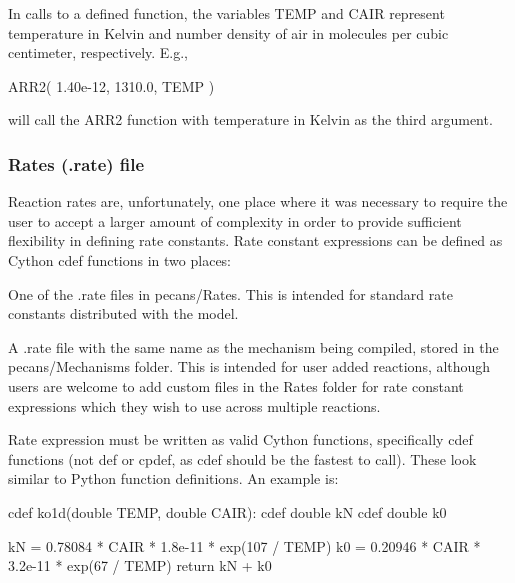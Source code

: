 In calls to a defined function, the variables {\ttfamily T\+E\+MP} and {\ttfamily C\+A\+IR} represent temperature in Kelvin and number density of air in molecules per cubic centimeter, respectively. E.\+g., \begin{DoxyVerb}ARR2( 1.40e-12, 1310.0, TEMP )
\end{DoxyVerb}


will call the {\ttfamily A\+R\+R2} function with temperature in Kelvin as the third argument.

\subsubsection*{Rates (.rate) file}

Reaction rates are, unfortunately, one place where it was necessary to require the user to accept a larger amount of complexity in order to provide sufficient flexibility in defining rate constants. Rate constant expressions can be defined as Cython {\ttfamily cdef} functions in two places\+:


\begin{DoxyEnumerate}
\item One of the {\ttfamily .rate} files in pecans/\+Rates. This is intended for standard rate constants distributed with the model.
\item A {\ttfamily .rate} file with the same name as the mechanism being compiled, stored in the pecans/\+Mechanisms folder. This is intended for user added reactions, although users are welcome to add custom files in the Rates folder for rate constant expressions which they wish to use across multiple reactions.
\end{DoxyEnumerate}

Rate expression must be written as valid Cython functions, specifically {\ttfamily cdef} functions (not {\ttfamily def} or {\ttfamily cpdef}, as {\ttfamily cdef} should be the fastest to call). These look similar to Python function definitions. An example is\+: \begin{DoxyVerb}cdef ko1d(double TEMP, double CAIR):
    cdef double kN
    cdef double k0

    kN = 0.78084 * CAIR * 1.8e-11 * exp(107 / TEMP)
    k0 = 0.20946 * CAIR * 3.2e-11 * exp(67 / TEMP)
    return kN + k0
\end{DoxyVerb}


